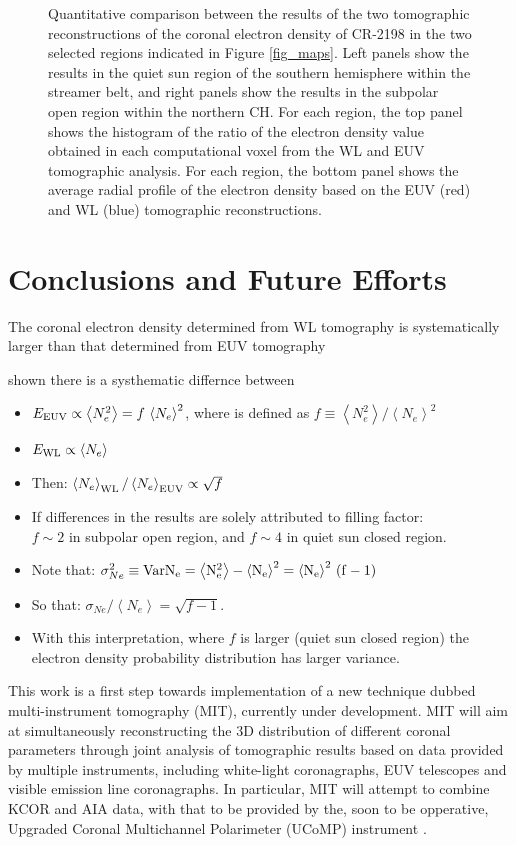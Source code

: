 \documentclass[baaa]{baaa}
\def\Eeuv{E_{\rm{EUV}}}
\def\Ewl{E_{\rm{WL}}}
\def\AvgNE2{\left<N_e^2\right>}
\def\AvgNe{\left<N_e\right>}
\def\SigmaNe{\sigma_{Ne}}
\begin{document}
\begin{figure}[h!]
  \caption{Quantitative comparison between the results of the two tomographic reconstructions of the coronal electron density of CR-2198 in the two selected regions indicated in Figure \ref{fig_maps}. Left panels show the results in the quiet sun region of the southern hemisphere within the streamer belt, and right panels show the results in the subpolar open region within the northern CH. For each region, the top panel shows the histogram of the ratio of the electron density value obtained in each computational voxel from the WL and EUV tomographic analysis. For each region, the bottom panel shows the average radial profile of the electron density based on the EUV (red) and WL (blue) tomographic reconstructions.}
  \label{fig_analysis}
\end{figure}

\section{Conclusions and Future Efforts}

The coronal electron density determined from WL tomography is systematically larger than that determined from EUV tomography

 shown there is a systhematic differnce between

\begin{itemize}
 \item  $\Eeuv \propto \AvgNE2 = f\,\AvgNe^2$, where  is defined as $f\equiv\AvgNE2 / \AvgNe^2$
\salto
\item  $\Ewl \propto \AvgNe$
\salto
\item  Then: $\AvgNe_{\rm{WL}} / \AvgNe_{\rm{EUV}} \propto \sqrt{f}$
\salto
\item  If differences in the results are solely attributed to filling factor:\\
  $f\sim 2$ in subpolar open region, and $f\sim 4$ in quiet sun closed region.
\salto
\item  Note that: $\SigmaNe^2 \equiv \rm{Var}N_e = \AvgNE2 - \AvgNe^2 = \AvgNe^2 \, (f-1)$
\salto
\item  So that: $\SigmaNe / \AvgNe = \sqrt{f-1}$.
\salto
\item  With this interpretation, where $f$ is larger (quiet sun closed region) the electron density probability distribution has larger variance.
\end{itemize}


This work is a first step towards implementation of a new technique dubbed multi-instrument tomography (MIT), currently under development. MIT will aim at simultaneously reconstructing the 3D distribution of different coronal parameters through joint analysis of tomographic results based on data provided by multiple instruments, including white-light coronagraphs, EUV telescopes and visible emission line coronagraphs. In particular, MIT will attempt to combine KCOR and AIA data, with that to be provided by the, soon to be opperative, Upgraded Coronal Multichannel Polarimeter (UCoMP) instrument \citep{landi_2016}.
\end{document}
